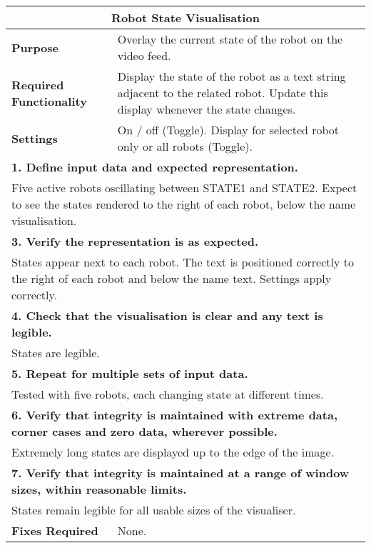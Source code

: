 \begin{longtable}{ l p{10cm} }
 \hline
 \multicolumn{2}{c}{\textbf{Robot State Visualisation}}\\
 \hline
 \textbf{Purpose} & Overlay the current state of the robot on the video feed.\\
 \textbf{Required Functionality} & Display the state of the robot as a text string adjacent to the related robot. Update this display whenever the state changes.\\
 \textbf{Settings} & On / off (Toggle). Display for selected robot only or all robots (Toggle).\\
 \hline
 \multicolumn{2}{p{14cm}}{\textbf{1. Define input data and expected representation.}}\\
 \multicolumn{2}{p{14cm}}{Five active robots oscillating between STATE1 and STATE2. Expect to see the states rendered to the right of each robot, below the name visualisation.}\\
 \hline
 \multicolumn{2}{p{14cm}}{\textbf{3. Verify the representation is as expected.}}\\
 \multicolumn{2}{p{14cm}}{States appear next to each robot. The text is positioned correctly to the right of each robot and below the name text. Settings apply correctly.}\\
 \hline
 \multicolumn{2}{p{14cm}}{\textbf{4. Check that the visualisation is clear and any text is legible.}}\\
 \multicolumn{2}{p{14cm}}{States are legible.}\\
 \hline
 \multicolumn{2}{p{14cm}}{\textbf{5. Repeat for multiple sets of input data.}}\\
 \multicolumn{2}{p{14cm}}{Tested with five robots, each changing state at different times.}\\
 \hline
 \multicolumn{2}{p{14cm}}{\textbf{6. Verify that integrity is maintained with extreme data, corner cases and zero data, wherever possible.}}\\
 \multicolumn{2}{p{14cm}}{Extremely long states are displayed up to the edge of the image.}\\
 \hline
 \multicolumn{2}{p{14cm}}{\textbf{7. Verify that integrity is maintained at a range of window sizes, within reasonable limits.}}\\
 \multicolumn{2}{p{14cm}}{States remain legible for all usable sizes of the visualiser.}\\
 \hline
 \textbf{Fixes Required} & None.\\
 \bottomrule
\end{longtable}
\clearpage

